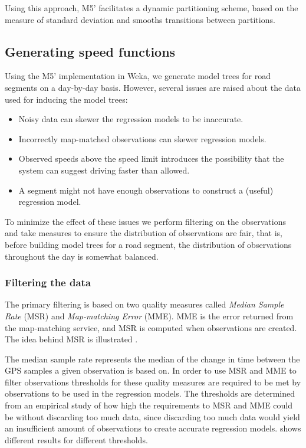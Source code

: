 Using this approach, M5' facilitates a dynamic partitioning scheme, based on the measure of standard deviation and smooths transitions between partitions.

\subsection{Generating speed functions}\label{sec:speedfunctiongen}
Using the M5' implementation in Weka, we generate model trees for road segments on a day-by-day basis. However, several issues are raised about the data used for inducing the model trees:
\begin{itemize}
\item Noisy data can skewer the regression models to be inaccurate.
\item Incorrectly map-matched observations can skewer regression models.
\item Observed speeds above the speed limit introduces the possibility that the system can suggest driving faster than allowed.
\item A segment might not have enough observations to construct a (useful) regression model.
\end{itemize}
To minimize the effect of these issues we perform filtering on the observations and take measures to ensure the distribution of observations are fair, that is, before building model trees for a road segment, the distribution of observations throughout the day is somewhat balanced.
\subsubsection{Filtering the data}
The primary filtering is based on two quality measures called \emph{Median Sample Rate} (MSR) and \emph{Map-matching Error} (MME). MME is the error returned from the map-matching service, and MSR is computed when observations are created. The idea behind MSR is illustrated .

The median sample rate represents the median of the change in time between the GPS samples a given observation is based on. 
In order to use MSR and MME to filter observations thresholds for these quality measures are required to be met by observations to be used in the regression models. The thresholds are determined from an empirical study of how high the requirements to MSR and MME could be without discarding too much data, since discarding too much data would yield an insufficient amount of observations to create accurate regression models.  shows different results for different thresholds.

